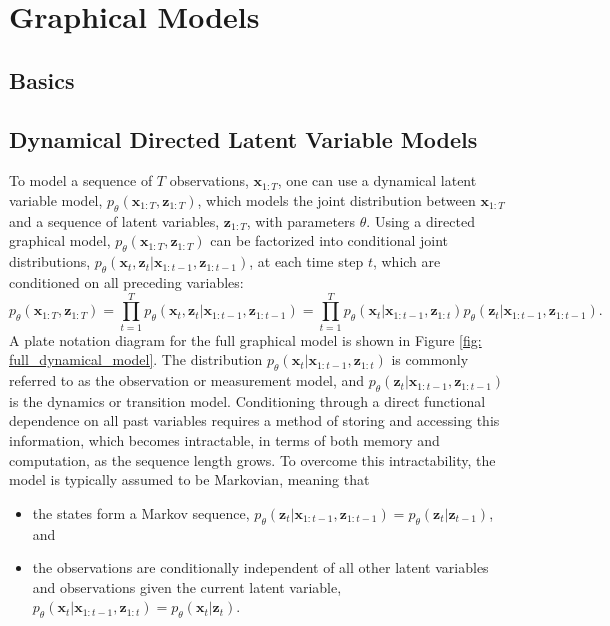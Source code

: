 \chapter{Graphical Models}

\section{Basics}

\section{Dynamical Directed Latent Variable Models}
\label{sec: dynamic directed latent variable models}

To model a sequence of $T$ observations, $\mathbf{x}_{1:T}$, one can use a dynamical latent variable model, $p_\theta (\mathbf{x}_{1:T}, \mathbf{z}_{1:T})$, which models the joint distribution between $\mathbf{x}_{1:T}$ and a sequence of latent variables, $\mathbf{z}_{1:T}$, with parameters $\theta$. Using a directed graphical model, $p_\theta (\mathbf{x}_{1:T}, \mathbf{z}_{1:T})$ can be factorized into conditional joint distributions, $p_\theta (\mathbf{x}_t, \mathbf{z}_t | \mathbf{x}_{1:t-1}, \mathbf{z}_{1:t-1})$, at each time step $t$, which are conditioned on all preceding variables:
\begin{equation}
    p_\theta (\mathbf{x}_{1:T}, \mathbf{z}_{1:T}) = \prod_{t=1}^T p_\theta (\mathbf{x}_t, \mathbf{z}_t | \mathbf{x}_{1:t-1}, \mathbf{z}_{1:t-1}) = \prod_{t=1}^T p_\theta (\mathbf{x}_t | \mathbf{x}_{1:t-1}, \mathbf{z}_{1:t}) p_\theta (\mathbf{z}_t | \mathbf{x}_{1:t-1}, \mathbf{z}_{1:t-1}).
    \label{eq: general dynamics model}
\end{equation}
A plate notation diagram for the full graphical model is shown in Figure \ref{fig: full_dynamical_model}. The distribution $p_\theta (\mathbf{x}_t | \mathbf{x}_{1:t-1}, \mathbf{z}_{1:t})$ is commonly referred to as the observation or measurement model, and $p_\theta (\mathbf{z}_t | \mathbf{x}_{1:t-1}, \mathbf{z}_{1:t-1})$ is the dynamics or transition model. Conditioning through a direct functional dependence on all past variables requires a method of storing and accessing this information, which becomes intractable, in terms of both memory and computation, as the sequence length grows. To overcome this intractability, the model is typically assumed to be Markovian, meaning that
\begin{itemize}
    \item the states form a Markov sequence, $p_\theta (\mathbf{z}_t | \mathbf{x}_{1:t-1}, \mathbf{z}_{1:t-1}) = p_\theta (\mathbf{z}_t | \mathbf{z}_{t-1}) $, and
    \item the observations are conditionally independent of all other latent variables and observations given the current latent variable, $p_\theta (\mathbf{x}_t | \mathbf{x}_{1:t-1}, \mathbf{z}_{1:t}) = p_\theta (\mathbf{x}_t | \mathbf{z}_t)$.
\end{itemize}
